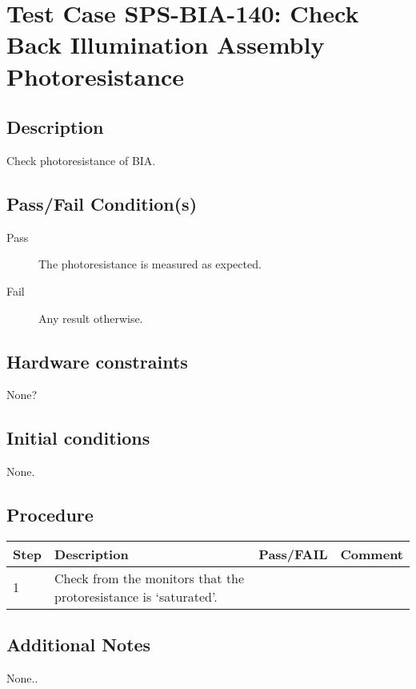 \section{Test Case SPS-BIA-140: Check Back Illumination Assembly Photoresistance}

\subsection{Description}

Check photoresistance of BIA.

\subsection{Pass/Fail Condition(s)}

\begin{description}
\item [Pass] The photoresistance is measured as expected.
\item [Fail] Any result otherwise. 
\end{description}

\subsection{Hardware constraints}

None?

\subsection{Initial conditions}

None.

\subsection{Procedure}

\begin{table}[H]
    \begin{tabular}{|l| p{5cm} |l| p{5cm} |}
    \hline
    {\bf Step} & {\bf Description} & {\bf Pass/FAIL} & {\bf Comment}  \\ \hline
    1 & Check from the monitors that the protoresistance is `saturated'. &  &  \\ \hline
    \end{tabular}
\end{table}

\subsection{Additional Notes}

None..
